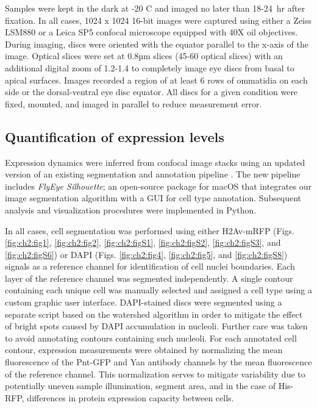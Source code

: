 Samples were kept in the dark at -20 \textdegree{}C and imaged no later than 18-24~hr after fixation. In all cases, 1024 x 1024 16-bit images were captured using either a Zeiss LSM880 or a Leica SP5 confocal microscope equipped with 40X oil objectives. During imaging, discs were oriented with the equator parallel to the x-axis of the image. Optical slices were set at 0.8µm slices (45-60 optical slices) with an additional digital zoom of 1.2-1.4 to completely image eye discs from basal to apical surfaces. Images recorded a region of at least 6 rows of ommatidia on each side or the dorsal-ventral eye disc equator. All discs for a given condition were fixed, mounted, and imaged in parallel to reduce measurement error.

\subsection{Quantification of expression levels}

Expression dynamics were inferred from confocal image stacks using an updated version of an existing segmentation and annotation pipeline \cite{Pelaez2015}. The new pipeline includes \textit{FlyEye Silhouette}; an open-source package for macOS that integrates our image segmentation algorithm with a GUI for cell type annotation. Subsequent analysis and visualization procedures were implemented in Python.

In all cases, cell segmentation was performed using either H2Av-mRFP (Figs. \ref{fig:ch2:fig1}, \ref{fig:ch2:fig2}, \ref{fig:ch2:figS1}, \ref{fig:ch2:figS2}, \ref{fig:ch2:figS3}, and \ref{fig:ch2:figS6}) or DAPI (Figs. \ref{fig:ch2:fig4}, \ref{fig:ch2:fig5}, and \ref{fig:ch2:figS8}) signals as a reference channel for identification of cell nuclei boundaries. Each layer of the reference channel was segmented independently. A single contour containing each unique cell was manually selected and assigned a cell type using a custom graphic user interface. DAPI-stained discs were segmented using a separate script based on the watershed algorithm in order to mitigate the effect of bright spots caused by DAPI accumulation in nucleoli. Further care was taken to avoid annotating contours containing such nucleoli. For each annotated cell contour, expression measurements were obtained by normalizing the mean fluorescence of the Pnt-GFP and Yan antibody channels by the mean fluorescence of the reference channel. This normalization serves to mitigate variability due to potentially uneven sample illumination, segment area, and in the case of His-RFP, differences in protein expression capacity between cells.

